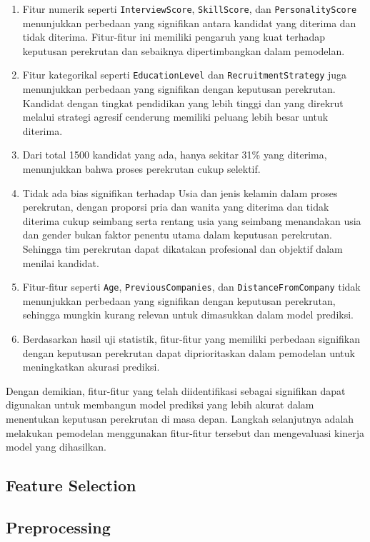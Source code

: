 \begin{enumerate}
    \item Fitur numerik seperti \texttt{InterviewScore}, \texttt{SkillScore}, dan \texttt{PersonalityScore} menunjukkan perbedaan yang signifikan antara kandidat yang diterima dan tidak diterima. Fitur-fitur ini memiliki pengaruh yang kuat terhadap keputusan perekrutan dan sebaiknya dipertimbangkan dalam pemodelan.
    \item Fitur kategorikal seperti \texttt{EducationLevel} dan \texttt{RecruitmentStrategy} juga menunjukkan perbedaan yang signifikan dengan keputusan perekrutan. Kandidat dengan tingkat pendidikan yang lebih tinggi dan yang direkrut melalui strategi agresif cenderung memiliki peluang lebih besar untuk diterima.
    \item Dari total 1500 kandidat yang ada, hanya sekitar 31\% yang diterima, menunjukkan bahwa proses perekrutan cukup selektif.
    \item Tidak ada bias signifikan terhadap Usia dan jenis kelamin dalam proses perekrutan, dengan proporsi pria dan wanita yang diterima dan tidak diterima cukup seimbang serta rentang usia yang seimbang menandakan usia dan gender bukan faktor penentu utama dalam keputusan perekrutan. Sehingga tim perekrutan dapat dikatakan profesional dan objektif dalam menilai kandidat.
    \item Fitur-fitur seperti \texttt{Age}, \texttt{PreviousCompanies}, dan \texttt{DistanceFromCompany} tidak menunjukkan perbedaan yang signifikan dengan keputusan perekrutan, sehingga mungkin kurang relevan untuk dimasukkan dalam model prediksi.
    \item Berdasarkan hasil uji statistik, fitur-fitur yang memiliki perbedaan signifikan dengan keputusan perekrutan dapat diprioritaskan dalam pemodelan untuk meningkatkan akurasi prediksi.
\end{enumerate}

Dengan demikian, fitur-fitur yang telah diidentifikasi sebagai signifikan dapat digunakan untuk membangun model prediksi yang lebih akurat dalam menentukan keputusan perekrutan di masa depan. Langkah selanjutnya adalah melakukan pemodelan menggunakan fitur-fitur tersebut dan mengevaluasi kinerja model yang dihasilkan.

\subsection{Feature Selection}
\subsection{Preprocessing}







